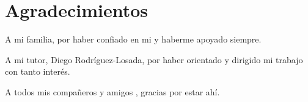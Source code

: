 
\chapter{Agradecimientos}

A mi familia, por haber confiado en mi y haberme apoyado siempre.

A mi tutor, Diego Rodríguez-Losada, por haber orientado y dirigido mi trabajo con tanto interés.

A todos mis compañeros y amigos , gracias por estar ahí.